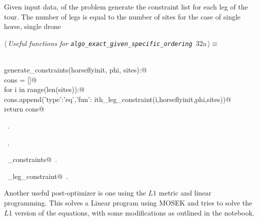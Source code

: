 \documentclass[11.5pt]{report}
\begin{document}
\vspace{-0.8cm} \newchunk Given input data, of the problem generate the constraint list for each leg 
of the tour. The number of legs is equal to the number of sites for the case of single horse, single drone
\begin{flushleft} \small\label{scrap45}\raggedright\small
{} $\langle\,${\itshape Useful functions for \verb|algo_exact_given_specific_ordering|}\nobreak\ {\footnotesize {32a}}$\,\rangle\equiv$
\vspace{-1ex}
\begin{list}{}{} \item
\mbox{}\verb@@\\
\mbox{}\verb@def generate_constraints(horseflyinit, phi, sites):@\\
\mbox{}\verb@   cons = []@\\
\mbox{}\verb@   for i in range(len(sites)):@\\
\mbox{}\verb@        cons.append({'type':'eq','fun': ith_leg_constraint(i,horseflyinit,phi,sites)})@\\
\mbox{}\verb@   return cons@\\
\mbox{}\verb@@{\NWsep}
\end{list}
\vspace{-1.5ex}
\footnotesize
\begin{list}{}{\setlength{\itemsep}{-\parsep}\setlength{\itemindent}{-\leftmargin}}
\item \NWtxtMacroDefBy\ .
\item \NWtxtMacroRefIn\ .
\item \NWtxtIdentsDefed\nobreak\  \verb@generate_constraints@\nobreak\ .\item \NWtxtIdentsUsed\nobreak\  \verb@ith_leg_constraint@\nobreak\ .
\item{}
\end{list}
\vspace{4ex}
\end{flushleft}




\vspace{-0.8cm} \newchunk Another useful post-optimizer is one using the $L1$ metric and linear programming. 
This solves a Linear program using MOSEK and tries to solve the 
$L1$ version of the equations, with some modifications as outlined
    in the notebook.
\end{document}
